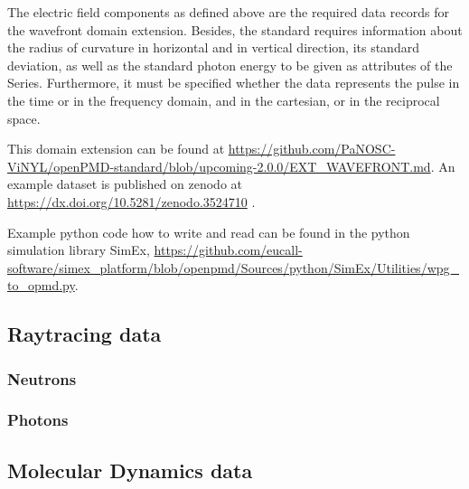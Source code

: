 \documentclass[11pt, a4paper]{article}
\begin{document}
The electric field components as defined above are the required data records for the wavefront domain extension.
Besides, the standard requires information about the radius of curvature in horizontal and in vertical direction, its
standard deviation, as well as the standard photon energy to be given as attributes of the Series. Furthermore, it must
be specified whether the data represents the pulse in the time or in the frequency domain, and in the cartesian, or in
the reciprocal space.

This domain extension can be found at \url{https://github.com/PaNOSC-ViNYL/openPMD-standard/blob/upcoming-2.0.0/EXT_WAVEFRONT.md}.
An example dataset is published on zenodo at \url{https://dx.doi.org/10.5281/zenodo.3524710}
\cite{Fortmann-Grote:zenodo2019}.

Example python code how to write and read can be found in the python simulation library SimEx,
\url{https://github.com/eucall-software/simex_platform/blob/openpmd/Sources/python/SimEx/Utilities/wpg_to_opmd.py}.

\subsection{Raytracing data}
\subsubsection{Neutrons}
\subsubsection{Photons}
\subsection{Molecular Dynamics data}
\printbibliography
\end{document}
